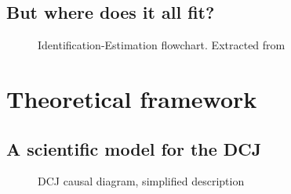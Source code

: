 \documentclass[
  authoryear,
  preprint,
  1p]{elsarticle}
\begin{document}
\subsection{But where does it all fit?}\label{sec-background-where}

\begin{figure}


\caption{\label{fig-IEflow}Identification-Estimation flowchart.
Extracted from \citet[32]{Neal_2020}}

\end{figure}%

\section{Theoretical framework}\label{sec-theory}

\subsection{A scientific model for the DCJ}\label{sec-theory-scientific}

\begin{figure}


\caption{\label{fig-SciModel_simp1}DCJ causal diagram, simplified
description}

\end{figure}%
\end{document}
